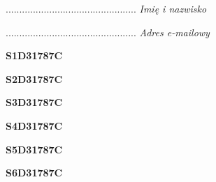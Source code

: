 \begin{turn}{90}\begin{minipage}{\linewidth} \vspace{20mm} ................................................  \textit{Imię i nazwisko}\end{minipage}\end{turn}

\begin{turn}{90}\begin{minipage}{\linewidth} \vspace{20mm} ................................................  \textit{Adres e-mailowy}\end{minipage}\end{turn}

\begin{turn}{90}\huge \begin{minipage}{\linewidth} \vspace{10mm}\textbf{S1D31787C}\end{minipage}\end{turn}

\begin{turn}{90}\huge \begin{minipage}{\linewidth} \vspace{10mm}\textbf{S2D31787C}\end{minipage}\end{turn}

\begin{turn}{90}\huge \begin{minipage}{\linewidth} \vspace{10mm}\textbf{S3D31787C}\end{minipage}\end{turn}

\begin{turn}{90}\huge \begin{minipage}{\linewidth} \vspace{10mm}\textbf{S4D31787C}\end{minipage}\end{turn}

\begin{turn}{90}\huge \begin{minipage}{\linewidth} \vspace{10mm}\textbf{S5D31787C}\end{minipage}\end{turn}

\begin{turn}{90}\huge \begin{minipage}{\linewidth} \vspace{10mm}\textbf{S6D31787C}\end{minipage}\end{turn}

